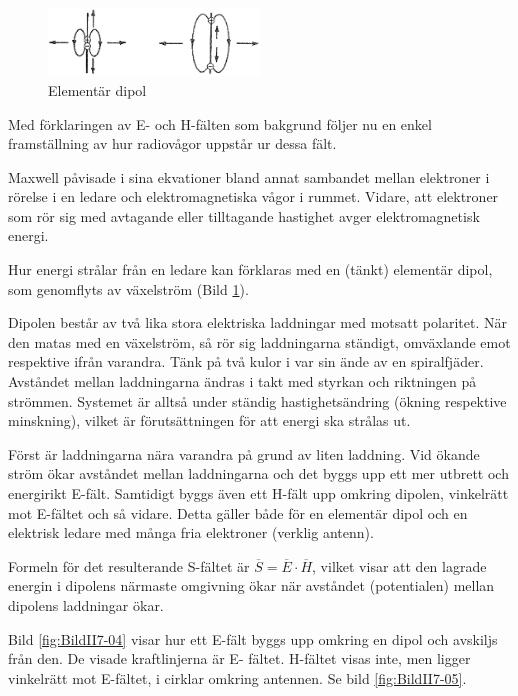 \begin{figure}
\includegraphics[width=0.5\textwidth]{images/cropped_pdfs/bild_2_7-03.pdf}
\caption{Elementär dipol}
\label{fig:BildII7-03}
\end{figure}

Med förklaringen av E- och H-fälten som bakgrund följer nu en enkel
framställning av hur radiovågor uppstår ur dessa fält.

Maxwell påvisade i sina ekvationer bland annat sambandet mellan elektroner
i rörelse i en ledare och elektromagnetiska vågor i rummet.
Vidare, att elektroner som rör sig med avtagande eller tilltagande hastighet
avger elektromagnetisk energi.

Hur energi strålar från en ledare kan förklaras med en (tänkt)
elementär dipol, som genomflyts av växelström (Bild \ref{fig:BildII7-03}).

Dipolen består av två lika stora elektriska laddningar med motsatt polaritet.
När den matas med en växelström, så rör sig laddningarna ständigt,
omväxlande emot respektive ifrån varandra.
Tänk på två kulor i var sin ände av en spiralfjäder.
Avståndet mellan laddningarna ändras i takt med styrkan och riktningen på
strömmen.
Systemet är alltså under ständig hastighetsändring (ökning respektive
minskning), vilket är förutsättningen för att energi ska strålas ut.

Först är laddningarna nära varandra på grund av liten laddning.
Vid ökande ström ökar avståndet mellan laddningarna och det byggs upp ett
mer utbrett och energirikt E-fält.
Samtidigt byggs även ett H-fält upp omkring dipolen, vinkelrätt mot E-fältet
och så vidare.
Detta gäller både för en elementär dipol och en elektrisk ledare med många fria
elektroner (verklig antenn).

Formeln för det resulterande S-fältet är \(\overline{S} =
\overline{E}\cdot\overline{H}\), vilket visar att den lagrade energin
i dipolens närmaste omgivning ökar när avståndet (potentialen) mellan
dipolens laddningar ökar.

Bild \ref{fig:BildII7-04} visar hur ett E-fält byggs upp omkring en dipol och
avskiljs från den.
De visade kraftlinjerna är E- fältet.
H-fältet visas inte, men ligger vinkelrätt mot E-fältet, i cirklar omkring
antennen. Se bild \ref{fig:BildII7-05}.

